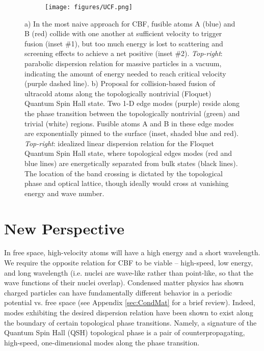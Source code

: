 \documentclass[onecolumn,
               superscriptaddress,
               floatfix,
               longbibliography, 
               showkeys,apl]{revtex4-2}
\begin{document}
\begin{figure}[H]
\begin{subfigure}{.5\textwidth}
    \centering
    \caption{}    
    \label{subfig:CBF}
\end{subfigure}
\begin{subfigure}{.5\textwidth}
    \centering
    \texttt{[image: figures/UCF.png]}
    \caption{}
    \label{subfig:UCF}
\end{subfigure}
\caption{a) In the most naive approach for CBF, fusible atoms A (blue) and B (red) collide with one another at sufficient velocity to trigger fusion (inset \#1), but too much energy is lost to scattering and screening effects to achieve a net positive (inset \#2). \textit{Top-right}: parabolic dispersion relation for massive particles in a vacuum, indicating the amount of energy needed to reach critical velocity (purple dashed line). b) Proposal for collision-based fusion of ultracold atoms along the topologically nontrivial (Floquet) Quantum Spin Hall state. Two 1-D edge modes (purple) reside along the phase transition between the topologically nontrivial (green) and trivial (white) regions. Fusible atoms A and B in these edge modes are exponentially pinned to the surface (inset, shaded blue and red). \textit{Top-right}: idealized linear dispersion relation for the Floquet Quantum Spin Hall state, where topological edges modes (red and blue lines) are energetically separated from bulk states (black lines). The location of the band crossing is dictated by the topological phase and optical lattice, though ideally would cross at vanishing energy and wave number.}
\end{figure}


\section{New Perspective}

In free space, high-velocity atoms will have a high energy and a short wavelength. We require the opposite relation for CBF to be viable -- high-speed, low energy, and long wavelength (i.e. nuclei are wave-like rather than point-like, so that the wave functions of their nuclei overlap). Condensed matter physics has shown charged particles can have fundamentally different behavior in a periodic potential vs. free space (see Appendix \ref{sec:CondMat} for a brief review). 
Indeed, modes exhibiting the desired dispersion relation have been shown to exist along the boundary of certain topological phase transitions. Namely, a signature of the Quantum Spin Hall (QSH) topological phase is a pair of counterpropagating, high-speed, one-dimensional modes along the phase transition.
\end{document}
